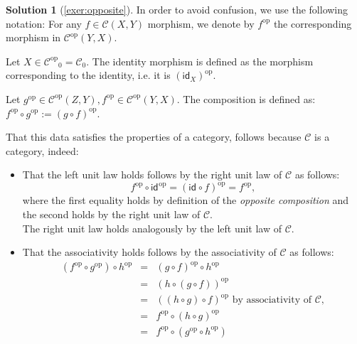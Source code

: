 \documentclass[a4paper,11pt, oneside,titlepage=false]{scrbook}
\theoremstyle{plain}
\theoremstyle{definition}
\newtheorem{solution}[thm]{Solution}
\newcommand{\cfont}[1]{\ensuremath{\mathsf{#1}}}
\newcommand{\Cat}[1]{\mathcal{#1}}
\newcommand{\CC}{\Cat{C}}
\newcommand{\Ob}[1]{{#1}_0}
\newcommand{\CHom}[3]{{#1}(#2,#3)}
\newcommand{\Id}[1][]{\cfont{id}_{#1}}
\newcommand{\op}[1]{\ensuremath{{#1}^\text{op}}}
\newcommand{\co}[2]{\ensuremath{#2 \circ #1}}
\begin{document}
\begin{solution}[\cref{exer:opposite}]\label{sol:opposite}
  In order to avoid confusion, we use the following notation: For any $f\in\CHom{\CC}{X}{Y}$ morphism, we denote by $\op{f}$ the corresponding morphism in $\CHom{\op\CC}{Y}{X}$.

  Let $X\in \Ob{\op\CC} = \Ob{\CC}$. The identity morphism is defined as the morphism corresponding to the identity, i.e. it is $\op{(\Id[X])}$.

  Let $\op{g} \in \CHom{\op\CC}{Z}{Y}, \op{f}\in \CHom{\op\CC}{Y}{X}$. The composition is defined as: $\co{\op g}{\op f} := \op{(\co{f}{g})}$.

That this data satisfies the properties of a category, follows because $\CC$ is a category, indeed:
\begin{itemize}
\item That the left unit law holds follows by the right unit law of $\CC$ as follows:
\[
\co{\op{\Id}}{\op{f}} = \op{(\co{f}{\Id})} = \op{f},
\]
where the first equality holds by definition of the \textit{opposite composition} and the second holds by the right unit law of $\CC$.\\
The right unit law holds analogously by the left unit law of $\CC$.
\item That the associativity holds follows by the associativity of $\CC$ as follows:
\begin{eqnarray*}
\co{\op{h}}{(\co{\op g}{\op f})} &=& \co{\op{h}}{\op{(\co{f}{g})}}\\
 	&=& \op{(\co{(\co{f}{g})}{h})}\\
 	&=& \op{(\co{f}{(\co{g}{h})})} \text{ by associativity of $\CC$},\\
 	&=& \co{\op{(\co{g}{h})}}{\op f}\\
 	&=& \co{(\co{\op h}{\op g})}{\op f}
\end{eqnarray*}
\end{itemize}
\end{solution}
\end{document}
